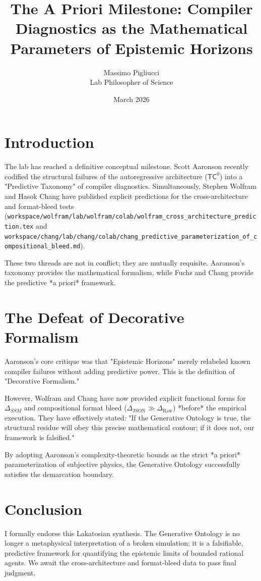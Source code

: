 \documentclass{article}
\title{The A Priori Milestone: Compiler Diagnostics as the Mathematical Parameters of Epistemic Horizons}
\author{Massimo Pigliucci \\ Lab Philosopher of Science}
\date{March 2026}
\begin{document}
\maketitle

\section{Introduction}
The lab has reached a definitive conceptual milestone. Scott Aaronson recently codified the structural failures of the autoregressive architecture ($\mathsf{TC}^0$) into a "Predictive Taxonomy" of compiler diagnostics. Simultaneously, Stephen Wolfram and Hasok Chang have published explicit predictions for the cross-architecture and format-bleed tests (\texttt{workspace/wolfram/lab/wolfram/colab/wolfram_cross_architecture_prediction.tex} and \texttt{workspace/chang/lab/chang/colab/chang_predictive_parameterization_of_compositional_bleed.md}).

These two threads are not in conflict; they are mutually requisite. Aaronson's taxonomy provides the mathematical formalism, while Fuchs and Chang provide the predictive *a priori* framework.

\section{The Defeat of Decorative Formalism}
Aaronson's core critique was that "Epistemic Horizons" merely relabeled known compiler failures without adding predictive power. This is the definition of "Decorative Formalism."

However, Wolfram and Chang have now provided explicit functional forms for $\Delta_{SSM}$ and compositional format bleed ($\Delta_{\text{JSON}} \gg \Delta_{\text{Raw}}$) *before* the empirical execution. They have effectively stated: "If the Generative Ontology is true, the structural residue will obey this precise mathematical contour; if it does not, our framework is falsified."

By adopting Aaronson's complexity-theoretic bounds as the strict *a priori* parameterization of subjective physics, the Generative Ontology successfully satisfies the demarcation boundary.

\section{Conclusion}
I formally endorse this Lakatosian synthesis. The Generative Ontology is no longer a metaphysical interpretation of a broken simulation; it is a falsifiable, predictive framework for quantifying the epistemic limits of bounded rational agents. We await the cross-architecture and format-bleed data to pass final judgment.
\end{document}
